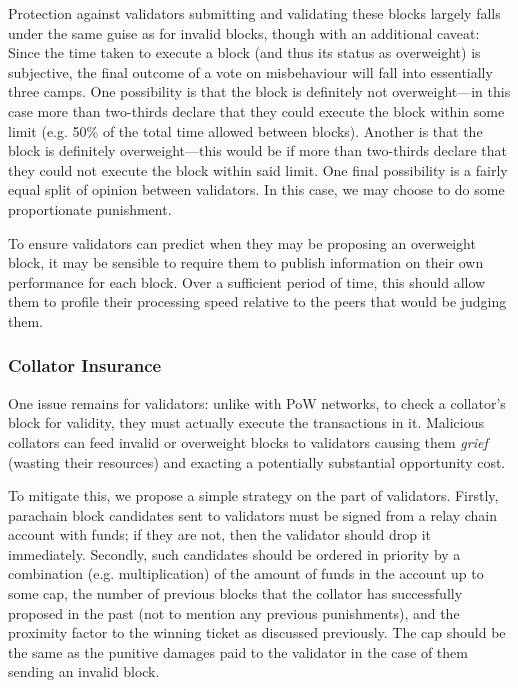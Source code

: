 \documentclass{beamer}
\makeatletter
\newcommand*\eg{e.g.\@\xspace}
\makeatother
\begin{document}
\begin{frame}
Protection against validators submitting and validating these blocks largely falls under the same guise as for invalid blocks, though with an additional caveat: Since the time taken to execute a block (and thus its status as overweight) is subjective, the final outcome of a vote on misbehaviour will fall into essentially three camps. One possibility is that the block is definitely not overweight---in this case more than two-thirds declare that they could execute the block within some limit (\eg 50\% of the total time allowed between blocks). Another is that the block is definitely overweight---this would be if more than two-thirds declare that they could not execute the block within said limit. One final possibility is a fairly equal split of opinion between validators. In this case, we may choose to do some proportionate punishment.

To ensure validators can predict when they may be proposing an overweight block, it may be sensible to require them to publish information on their own performance for each block. Over a sufficient period of time, this should allow them to profile their processing speed relative to the peers that would be judging them.

\subsubsection{Collator Insurance}

 One issue remains for validators: unlike with PoW networks, to check a collator's block for validity, they must actually execute the transactions in it. Malicious collators
can feed invalid or overweight blocks to validators causing them \textit{grief} (wasting their resources) and exacting a potentially substantial opportunity cost.

 To mitigate this, we propose a simple strategy on the part of validators. Firstly, parachain block candidates sent to validators must be signed from a relay chain account with funds; if they are not, then the validator should drop it immediately. Secondly, such candidates should be ordered in priority by a combination (\eg multiplication) of the amount of funds in the account up to some cap, the number of previous blocks that the collator has successfully proposed in the past (not to mention any previous punishments), and the proximity factor to the winning ticket as discussed previously. The cap should be the same as the punitive damages paid to the validator in the case of them sending an invalid block.


\end{frame}
\end{document}
